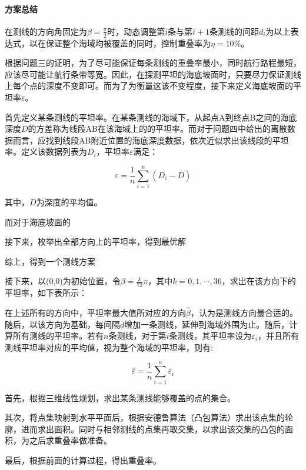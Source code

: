 \paragraph{方案总结}

在测线的方向角固定为$\beta = \frac{\pi}{2}$时，动态调整第$i$条与第$i + 1$条测线的间距$d_i$为以上表达式，以在保证整个海域均被覆盖的同时，控制重叠率为$\eta = 10\%$。




根据问题三的证明，为了尽可能保证每条测线的重叠率最小，同时航行路程最短，应该尽可能让航行条带等宽。因此，在探测平坦的海底坡面时，只要尽力保证测线上每个点的深度不变即可。而为了为衡量这该不变程度，接下来定义海底坡面的平坦率$\varepsilon$。

首先定义某条测线的平坦率。在某条测线的海域下，从起点A到终点B之间的海底深度$D$的方差称为线段AB在该海域上的的平坦率。而对于问题四中给出的离散数据而言，应找到线段AB附近位置的海底深度数据，依次近似求出该线段的平坦率。定义该数据列表为$D_{i}$，平坦率$\varepsilon$满足：

\begin{equation}
    \varepsilon = \frac{1}{n} \sum^{n}_{i=1}(D_i - \overline{D} ) 
\end{equation}

其中，$\overline{D}$为深度的平均值。

而对于海底坡面的

接下来，枚举出全部方向上的平坦率，得到最优解

综上，得到一个测线方案

接下来，以(0,0)为初始位置，令$\beta = \frac{k}{72}\pi$，其中$k = 0, 1, \cdots, 36$，求出在该方向下的平坦率，如下表所示：




在上述所有的方向中，平坦率最大值所对应的方向$\hat \beta$，认为是测线方向最合适的。随后，以该方向为基础，每间隔$d$增加一条测线，延伸到海域外围为止。随后，计算所有测线的平坦率。若有$n$条测线，对于第$i$条测线，其平坦率设为$\varepsilon_i$，并且所有测线平坦率对应的平均值，视为整个海域的平坦率，则有:

\begin{equation}
    \overline{\varepsilon} = \frac{1}{n} \sum^{n}_{i=1}\varepsilon_i 
\end{equation}


首先，根据三维线性规划，求出某条测线能够覆盖的点的集合。

其次，将点集映射到水平平面后，根据安德鲁算法（凸包算法）求出该点集的轮廓，进而求出面积。同时与相邻测线的点集再取交集，以求出该交集的凸包的面积，为之后求重叠率做准备。

最后，根据前面的计算过程，得出重叠率。


